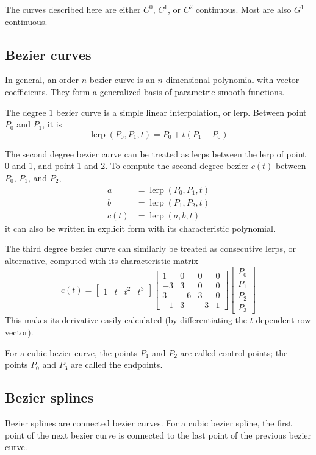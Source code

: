 \documentclass[11pt]{article}
\begin{document}
The curves described here are either $C^0$, $C^1$, or $C^2$ continuous. Most are also $G^1$ continuous.

\subsection{Bezier curves}
In general, an order $n$ bezier curve is an $n$ dimensional polynomial with vector coefficients. They form a generalized basis of parametric smooth functions.

The degree $1$ bezier curve is a simple linear interpolation, or lerp. Between point $P_0$ and $P_1$, it is
\[
	\operatorname{lerp}(P_0, P_1, t) = P_0 + t (P_1 - P_0)
\]

The second degree bezier curve can be treated as lerps between the lerp of point 0 and 1, and point 1 and 2. To compute the second degree bezier $c(t)$ between $P_0$, $P_1$, and $P_2$,
\begin{align*}
	a &= \operatorname{lerp}(P_0, P_1, t)\\
	b &= \operatorname{lerp}(P_1, P_2, t)\\
	c(t) &= \operatorname{lerp}(a, b, t)
\end{align*}
it can also be written in explicit form with its characteristic polynomial.

The third degree bezier curve can similarly be treated as consecutive lerps, or alternative, computed with its characteristic matrix
\[
	c(t) = \begin{bmatrix}
		1 & t & t^2 & t^3
	\end{bmatrix}
	\begin{bmatrix}
		1 & 0 & 0 & 0\\
		-3 & 3 & 0 & 0\\
		3 & -6 & 3 & 0\\
		-1 & 3 & -3 & 1
	\end{bmatrix}
	\begin{bmatrix}
		P_0\\
		P_1\\
		P_2\\
		P_3
	\end{bmatrix}
\]
This makes its derivative easily calculated (by differentiating the $t$ dependent row vector).

For a cubic bezier curve, the points $P_1$ and $P_2$ are called control points; the points $P_0$ and $P_3$ are called the endpoints.

\subsection{Bezier splines}
Bezier splines are connected bezier curves. For a cubic bezier spline, the first point of the next bezier curve is connected to the last point of the previous bezier curve.
\end{document}
